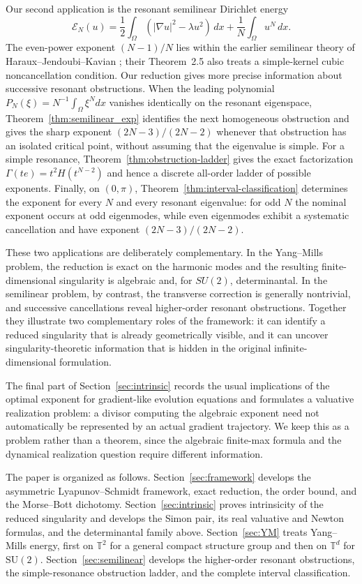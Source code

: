 \documentclass[11pt]{article}
\theoremstyle{definition}
\theoremstyle{remark}
\begin{document}
Our second application is the resonant semilinear Dirichlet energy
$$
\mathcal E_N(u)=\frac12\int_\Omega(|\nabla u|^2-\lambda u^2)\,dx+\frac1N\int_\Omega u^N\,dx.
$$
The even-power exponent $(N-1)/N$ lies within the earlier semilinear theory of Haraux--Jendoubi--Kavian \cite[Theorem~2.2]{HarauxJendoubiKavian2003}; their Theorem~2.5 also treats a simple-kernel cubic noncancellation condition. Our reduction gives more precise information about successive resonant obstructions. When the leading polynomial $P_N(\xi)=N^{-1}\int_\Omega\xi^Ndx$ vanishes identically on the resonant eigenspace, Theorem~\ref{thm:semilinear_exp} identifies the next homogeneous obstruction and gives the sharp exponent $(2N-3)/(2N-2)$ whenever that obstruction has an isolated critical point, without assuming that the eigenvalue is simple. For a simple resonance, Theorem~\ref{thm:obstruction-ladder} gives the exact factorization $\Gamma(te)=t^2H(t^{N-2})$ and hence a discrete all-order ladder of possible exponents. Finally, on $(0,\pi)$, Theorem~\ref{thm:interval-classification} determines the exponent for every $N$ and every resonant eigenvalue: for odd $N$ the nominal exponent occurs at odd eigenmodes, while even eigenmodes exhibit a systematic cancellation and have exponent $(2N-3)/(2N-2)$.

These two applications are deliberately complementary. In the Yang--Mills problem, the reduction is exact on the harmonic modes and the resulting finite-dimensional singularity is algebraic and, for $SU(2)$, determinantal. In the semilinear problem, by contrast, the transverse correction is generally nontrivial, and successive cancellations reveal higher-order resonant obstructions. Together they illustrate two complementary roles of the framework: it can identify a reduced singularity that is already geometrically visible, and it can uncover singularity-theoretic information that is hidden in the original infinite-dimensional formulation.

The final part of Section~\ref{sec:intrinsic} records the usual implications of the optimal exponent for gradient-like evolution equations and formulates a valuative realization problem: a divisor computing the algebraic exponent need not automatically be represented by an actual gradient trajectory. We keep this as a problem rather than a theorem, since the algebraic finite-max formula and the dynamical realization question require different information.

The paper is organized as follows. Section~\ref{sec:framework} develops the asymmetric Lyapunov--Schmidt framework, exact reduction, the order bound, and the Morse--Bott dichotomy. Section~\ref{sec:intrinsic} proves intrinsicity of the reduced singularity and develops the Simon pair, its real valuative and Newton formulas, and the determinantal family above. Section~\ref{sec:YM} treats Yang--Mills energy, first on $\mathbb T^2$ for a general compact structure group and then on $\mathbb T^d$ for $\mathrm{SU}(2)$. Section~\ref{sec:semilinear} develops the higher-order resonant obstructions, the simple-resonance obstruction ladder, and the complete interval classification.
\end{document}
